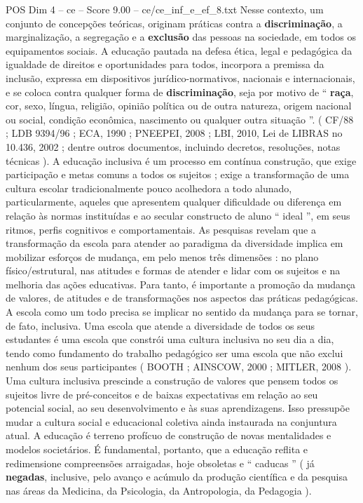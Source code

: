 \begin{textsample}{POS Dim 4 – ce – Score 9.00 – ce/ce\_inf\_e\_ef\_8.txt}
Nesse contexto, um conjunto de concepções teóricas, originam práticas contra a \textbf{discriminação}, a marginalização, a segregação e a \textbf{exclusão} das pessoas na sociedade, em todos os equipamentos sociais.
A educação pautada na defesa ética, legal e pedagógica da igualdade de direitos e oportunidades para todos, incorpora a premissa da inclusão, expressa em dispositivos jurídico-normativos, nacionais e internacionais, e se coloca contra qualquer forma de \textbf{discriminação}, seja por motivo de “ \textbf{raça}, cor, sexo, língua, religião, opinião política ou de outra natureza, origem nacional ou social, condição econômica, nascimento ou qualquer outra situação ”. ( CF/88 ; LDB 9394/96 ; ECA, 1990 ; PNEEPEI, 2008 ; LBI, 2010, Lei de LIBRAS no 10.436, 2002 ; dentre outros documentos, incluindo decretos, resoluções, notas técnicas ).
A educação inclusiva é um processo em contínua construção, que exige participação e metas comuns a todos os sujeitos ; exige a transformação de uma cultura escolar tradicionalmente pouco acolhedora a todo alunado, particularmente, aqueles que apresentem qualquer dificuldade ou diferença em relação às normas instituídas e ao secular constructo de aluno “ ideal ”, em seus ritmos, perfis cognitivos e comportamentais.
As pesquisas revelam que a transformação da escola para atender ao paradigma da diversidade implica em mobilizar esforços de mudança, em pelo menos três dimensões : no plano físico/estrutural, nas atitudes e formas de atender e lidar com os sujeitos e na melhoria das ações educativas.
Para tanto, é importante a promoção da mudança de valores, de atitudes e de transformações nos aspectos das práticas pedagógicas.
A escola como um todo precisa se implicar no sentido da mudança para se tornar, de fato, inclusiva.
Uma escola que atende a diversidade de todos os seus estudantes é uma escola que constrói uma cultura inclusiva no seu dia a dia, tendo como fundamento do trabalho pedagógico ser uma escola que não exclui nenhum dos seus participantes ( BOOTH ; AINSCOW, 2000 ; MITLER, 2008 ).
Uma cultura inclusiva prescinde a construção de valores que pensem todos os sujeitos livre de pré-conceitos e de baixas expectativas em relação ao seu potencial social, ao seu desenvolvimento e às suas aprendizagens.
Isso pressupõe mudar a cultura social e educacional coletiva ainda instaurada na conjuntura atual.
A educação é terreno profícuo de construção de novas mentalidades e modelos societários.
É fundamental, portanto, que a educação reflita e redimensione compreensões arraigadas, hoje obsoletas e “ caducas ” ( já \textbf{negadas}, inclusive, pelo avanço e acúmulo da produção científica e da pesquisa nas áreas da Medicina, da Psicologia, da Antropologia, da Pedagogia ).

\end{textsample}
